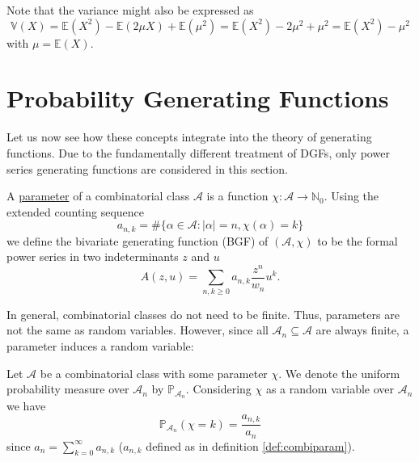 \noindent Note that the variance might also be expressed as
\begin{equation*}
    \mathbb{V}(X) = \mathbb{E}(X^2) - \mathbb{E}(2 \mu X)+ \mathbb{E}(\mu ^2) = \mathbb{E}(X^2) - 2 \mu^2 + \mu^2 = \mathbb{E}(X^2) - \mu^2
\end{equation*}
with $\mu = \mathbb{E}(X)$.









\section{Probability Generating Functions}

Let us now see how these concepts integrate into the theory of generating functions.
Due to the fundamentally different treatment of DGFs, only power series generating functions are considered in this section. 

\begin{defn}
\label{def:combiparam}
A \ul{parameter} of a combinatorial class $\mathcal{A}$ is a function $\chi: \mathcal{A} \to \mathbb{N}_0$.
Using the extended counting sequence
\begin{equation*}
    a_{n,k} = \# \{  \alpha \in \mathcal{A} : |\alpha| = n, \chi(\alpha) = k  \}
\end{equation*}
we define the bivariate generating function (BGF) of $(\mathcal{A}, \chi)$ to be the formal power series in two indeterminants $z$ and $u$
\begin{equation*}
    A(z,u) = \sum_{n,k \geq 0} a_{n,k} \frac{z^n}{w_n} u^k.
\end{equation*}
\end{defn}

In general, combinatorial classes do not need to be finite. Thus, parameters are not the same as random variables.
However, since all $\mathcal{A}_n \subseteq \mathcal{A}$ are always finite, a parameter induces a random variable:

Let $\mathcal{A}$ be a combinatorial class with some parameter $\chi$.
We denote the uniform probability measure over $\mathcal{A}_n$ by $\mathbb{P}_{\mathcal{A}_n}$.
Considering $\chi$ as a random variable over $\mathcal{A}_n$ we have
\begin{equation}
\label{eq:paramprob}
    \mathbb{P}_{\mathcal{A}_n}(\chi = k) = \frac{a_{n,k}}{a_n}
\end{equation}
since $a_n = \sum_{k=0}^\infty a_{n,k}$ ($a_{n,k}$ defined as in definition \ref{def:combiparam}).

